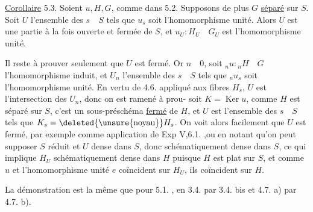 

\uline{Corollaire} 5.3. Soient $u,H,G$, comme dans 5.2. Supposons de plus
$G$ \uline{séparé} sur $S$. Soit $U$ l'ensemble des $s\quad S$ tels que $u_s$ soit l'homomorphisme unité. Alors $U$ est une partie à la fois ouverte et fermée de $S$,
et $u_U:H_U\quad G_U$ est l'homomorphisme unité.

Il reste à prouver seulement que $U$ est fermé. Or 
$n\quad0$, soit ${}_n u:{}_n H\quad G$ l'homomorphisme induit, et $U_n$ l'ensemble des
$s\quad S$ tels que ${}_n u_s$ soit l'homomorphisme unité. En vertu de 4.6. appliqué
aux fibres $H_s$, $U$ est l'intersection des $U_n$, donc on est ramené à prou-
soit $K=\operatorname{Ker}u$, comme $H$ est séparé sur $S$, c'est un sous-préschéma
\uline{fermé} de $H$, et $U$ est l'ensemble des $s\quad S$ tels que $K_s=\deleted{\text{\unsure{noyau}}}H_s$. On
voit alors  facilement que $U$ est fermé, par exemple comme
application de Exp V,6.1. ,ou en  notant qu'on peut
supposer $S$ réduit et $U$ dense dans $S$, donc schématiquement dense dans $S$,
ce qui implique $H_U$ schématiquement dense dans $H$ puisque $H$ est plat sur
$S$, et comme $u$ et l'homomorphisme unité $e$ coïncident sur $H_U$, ils
coïncident sur $H$.

La démonstration est la même que pour 5.1. , en 
3.4. par 3.4. bis et 4.7. a) par 4.7. b).


